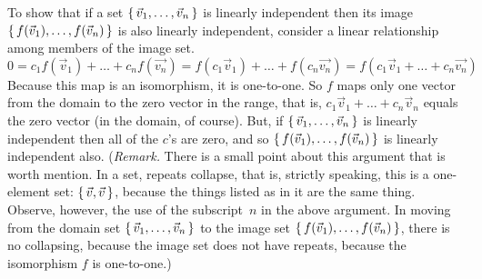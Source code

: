 \begin{exercises}
\begin{answer}
       To show that if a set $\mbox{$\{\,\vec{v}_1,\dots,\vec{v}_n\,\}$}$ is linearly
       independent then its image $\mbox{$\{\,f(\vec{v}_1),\dots,f(\vec{v}_n)\,\}$}$
       is also linearly independent, consider a linear relationship
       among members of the image set.
       \begin{equation*}
         0=c_1f(\vec{v}_1)+\dots+c_nf(\vec{v_n})
          =f(c_1\vec{v}_1)+\dots+f(c_n\vec{v_n})
          =f(c_1\vec{v}_1+\dots+c_n\vec{v_n})
       \end{equation*}
       Because this map is an isomorphism, it is one-to-one.
       So $f$ maps only one vector from the domain to the zero vector in the
       range, that is, $c_1\vec{v}_1+\dots+c_n\vec{v}_n$ equals the 
       zero vector (in the domain, of course).
       But, if $\mbox{$\{\,\vec{v}_1,\dots,\vec{v}_n\,\}$}$ is linearly
       independent then all of the $c$'s are zero, and so 
       $\mbox{$\{\,f(\vec{v}_1),\dots,f(\vec{v}_n)\,\}$}$ is linearly independent also.
       (\textit{Remark.}
       There is a small point about this argument that is worth mention.
       In a set, repeats collapse, that is, strictly speaking, this is a
       one-element set: $\mbox{$\{\,\vec{v},\vec{v}\,\}$}$, because the things
       listed as in it are the same thing.
       Observe, however, the use of the subscript~$n$ in the above argument.
       In moving from the domain set $\mbox{$\{\,\vec{v}_1,\dots,\vec{v}_n\,\}$}$ to
       the image set 
       $\mbox{$\{\,f(\vec{v}_1),\dots,f(\vec{v}_n)\,\}$}$, there is no collapsing,
       because the image set does not have repeats,
       because the isomorphism $f$ is one-to-one.)


\end{answer}
\end{exercises}
